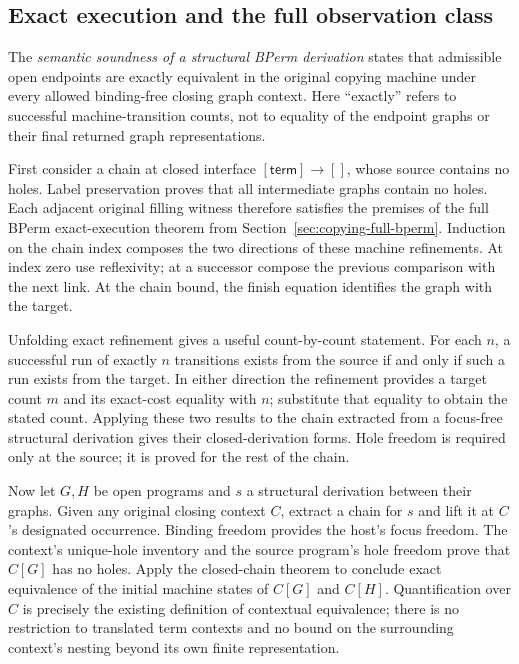 
\subsection{Exact execution and the full observation class}
The \emph{semantic soundness of a structural BPerm derivation} states that
admissible open endpoints are exactly equivalent in the original copying
machine under every allowed binding-free closing graph context. Here
``exactly'' refers to successful machine-transition counts, not to equality
of the endpoint graphs or their final returned graph representations.

First consider a chain at closed interface $[\mathsf{term}]\to[]$, whose
source contains no holes. Label preservation proves that all intermediate
graphs contain no holes. Each adjacent original filling witness therefore
satisfies the premises of the full BPerm exact-execution theorem from
Section~\ref{sec:copying-full-bperm}. Induction on the chain index composes the
two directions of these machine refinements. At index zero use reflexivity;
at a successor compose the previous comparison with the next link. At the
chain bound, the finish equation identifies the graph with the target.


Unfolding exact refinement gives a useful count-by-count statement. For each
$n$, a successful run of exactly $n$ transitions exists from the source if
and only if such a run exists from the target. In either direction the
refinement provides a target count $m$ and its exact-cost equality with $n$;
substitute that equality to obtain the stated count. Applying these two results
to the chain extracted from a focus-free structural derivation gives their
closed-derivation forms. Hole freedom is required only at the source; it is
proved for the rest of the chain.


Now let $G,H$ be open programs and $s$ a structural derivation between their
graphs. Given any original closing context $C$, extract a chain for $s$ and
lift it at $C$'s designated occurrence. Binding freedom provides the host's
focus freedom. The context's unique-hole inventory and the source program's
hole freedom prove that $C[G]$ has no holes. Apply the closed-chain theorem
to conclude exact equivalence of the initial machine states of $C[G]$ and
$C[H]$. Quantification over $C$ is precisely the existing definition of
contextual equivalence; there is no restriction to translated term contexts
and no bound on the surrounding context's nesting beyond its own finite
representation.

